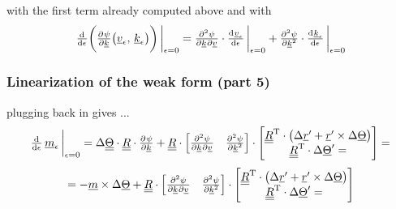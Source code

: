 \begin{frame}
  \vspace{1em}
  with the first term already computed above and with
  \begin{displaymath}
    \od{}{\epsilon} \biggl( \pd{\psi}{\underline{k}} \bigl( \underline{v}_{\epsilon}, \, \underline{k}_{\epsilon} \bigr) \biggr) \sVert[3]_{\epsilon=0} =
     \md{\psi}{2}{\underline{k}}{}{\underline{v}}{} \cdot \od{\underline{v}_{\epsilon}}{\epsilon} \sVert[3]_{\epsilon=0} +
     \pd[2]{\psi}{\underline{k}} \cdot \od{\underline{k}_{\epsilon}}{\epsilon} \sVert[3]_{\epsilon=0}
  \end{displaymath}

  
\end{frame}


\begin{frame}
  \frametitle{Linearization of the weak form (part 5)}
  
  plugging back in gives ...
  \begin{displaymath}
    \od{}{\epsilon} \, \underline{m}_{\epsilon} \sVert[3]_{\epsilon=0} = 
    \Delta \doubleunderline{\Theta} \cdot \doubleunderline{R} \cdot \pd{\psi}{\underline{k}} +
    \doubleunderline{R} \cdot
    \begin{bmatrix}
      \md{\psi}{2}{\underline{k}}{}{\underline{v}}{} & \pd[2]{\psi}{\underline{k}}
    \end{bmatrix} \cdot
    \begin{bmatrix}
      \doubleunderline{R}^{\mathrm{T}} \cdot \bigl( \Delta \underline{r}^{\prime} + \underline{r}^{\prime} \times \Delta \underline{\Theta} \bigr) \\
      \doubleunderline{R}^{\mathrm{T}} \cdot \Delta \underline{\Theta}^{\prime} =
    \end{bmatrix} =
  \end{displaymath}
  \begin{displaymath}
    = - \underline{m} \times \Delta \underline{\Theta} +
    \doubleunderline{R} \cdot
    \begin{bmatrix}
      \md{\psi}{2}{\underline{k}}{}{\underline{v}}{} & \pd[2]{\psi}{\underline{k}}
    \end{bmatrix} \cdot
    \begin{bmatrix}
      \doubleunderline{R}^{\mathrm{T}} \cdot \bigl( \Delta \underline{r}^{\prime} + \underline{r}^{\prime} \times \Delta \underline{\Theta} \bigr) \\
      \doubleunderline{R}^{\mathrm{T}} \cdot \Delta \underline{\Theta}^{\prime} =
    \end{bmatrix} 
  \end{displaymath}
  

\end{frame}

